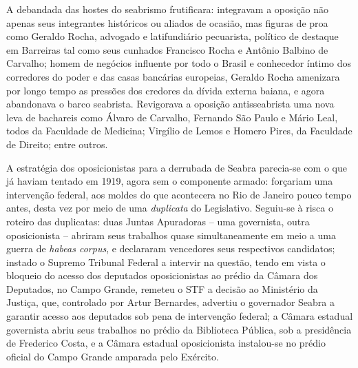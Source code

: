 A debandada das hostes do seabrismo frutificara: integravam a oposição não apenas seus integrantes históricos ou aliados de ocasião, mas figuras de proa como Geraldo Rocha, advogado e latifundiário pecuarista, político de destaque em Barreiras tal como seus cunhados Francisco Rocha e Antônio Balbino de Carvalho; homem de negócios influente por todo o Brasil e conhecedor íntimo dos corredores do poder e das casas bancárias europeias, Geraldo Rocha amenizara por longo tempo as pressões dos credores da dívida externa baiana, e agora abandonava o barco seabrista. Revigorava a oposição antisseabrista uma nova leva de bachareis como Álvaro de Carvalho, Fernando São Paulo e Mário Leal, todos da Faculdade de Medicina; Virgílio de Lemos e Homero Pires, da Faculdade de Direito; entre outros.

A estratégia dos oposicionistas para a derrubada de Seabra parecia-se com o que já haviam tentado em 1919, agora sem o componente armado: forçariam uma intervenção federal, aos moldes do que acontecera no Rio de Janeiro pouco tempo antes, desta vez por meio de uma \textit{duplicata} do Legislativo. Seguiu-se à risca o roteiro das duplicatas: duas Juntas Apuradoras -- uma governista, outra oposicionista -- abriram seus trabalhos quase simultaneamente em meio a uma guerra de \textit{habeas corpus}, e declararam vencedores seus respectivos candidatos; instado o Supremo Tribunal Federal a intervir na questão, tendo em vista o bloqueio do acesso dos deputados oposicionistas ao prédio da Câmara dos Deputados, no Campo Grande, remeteu o STF a decisão ao Ministério da Justiça, que, controlado por Artur Bernardes, advertiu o governador Seabra a garantir acesso aos deputados sob pena de intervenção federal; a Câmara estadual governista abriu seus trabalhos no prédio da Biblioteca Pública, sob a presidência de Frederico Costa, e a Câmara estadual oposicionista instalou-se no prédio oficial do Campo Grande amparada pelo Exército.

